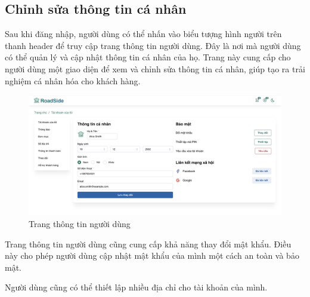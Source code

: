 \subsection{Chỉnh sửa thông tin cá nhân}
Sau khi đăng nhập, người dùng có thể nhấn vào biểu tượng hình người trên thanh header để truy cập trang thông tin người dùng. Đây là nơi mà người dùng có thể quản lý và cập nhật thông tin cá nhân của họ. Trang này cung cấp cho người dùng một giao diện để xem và chỉnh sửa thông tin cá nhân, giúp tạo ra trải nghiệm cá nhân hóa cho khách hàng.

    \begin{figure}[H]
        \centering
        \includegraphics[scale=0.3] {Images/UI/info profile.png}
        \vspace{1em}
        \caption{Trang thông tin người dùng}
    \end{figure}
Trang thông tin người dùng cũng cung cấp khả năng thay đổi mật khẩu. Điều này cho phép người dùng cập nhật mật khẩu của mình một cách an toàn và bảo mật.

Người dùng cũng có thể thiết lập nhiều địa chỉ cho tài khoản của mình.  

